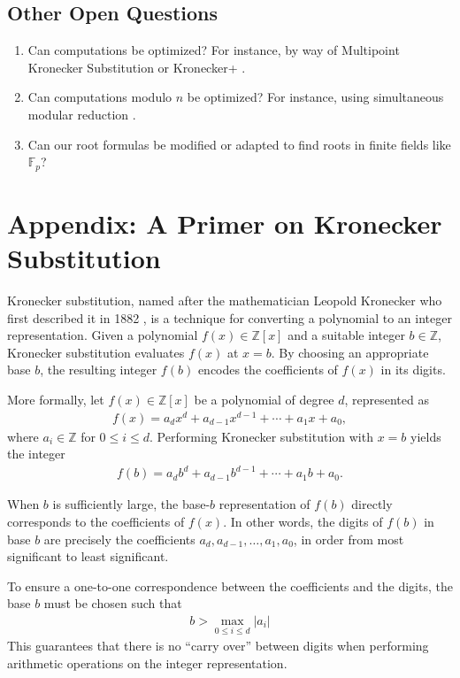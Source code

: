 \documentclass[11pt,reqno]{article}
\theoremstyle{plain}
\theoremstyle{definition}
\begin{document}
\subsection{Other Open Questions}
\begin{enumerate}
    \item Can computations be optimized? For instance, by way of Multipoint Kronecker Substitution \cite{harvey2009kronecker} or Kronecker+ \cite{bos2020postquantum}.
    \item Can computations modulo $n$ be optimized? For instance, using simultaneous modular reduction \cite{dumas2011simulataneous}.
    \item Can our root formulas be modified or adapted to find roots in finite fields like $\mathbb{F}_p$?
\end{enumerate}

\newpage
\section{Appendix: A Primer on Kronecker Substitution} \label{section:kronecker}
Kronecker substitution, named after the mathematician Leopold Kronecker who first described it in 1882 \cite{kronecker1882}, is a technique for converting a polynomial to an integer representation. Given a polynomial $f(x) \in \mathbb{Z}[x]$ and a suitable integer $b \in \mathbb{Z}$, Kronecker substitution evaluates $f(x)$ at $x = b$. By choosing an appropriate base $b$, the resulting integer $f(b)$ encodes the coefficients of $f(x)$ in its digits.

More formally, let $f(x) \in \mathbb{Z}[x]$ be a polynomial of degree $d$, represented as
\begin{align*}
f(x) = a_d x^d + a_{d-1} x^{d-1} + \cdots + a_1 x + a_0,
\end{align*}
where $a_i \in \mathbb{Z}$ for $0 \leq i \leq d$. Performing Kronecker substitution with $x = b$ yields the integer
\begin{align*}
f(b) = a_d b^d + a_{d-1} b^{d-1} + \cdots + a_1 b + a_0.
\end{align*}

When $b$ is sufficiently large, the base-$b$ representation of $f(b)$ directly corresponds to the coefficients of $f(x)$. In other words, the digits of $f(b)$ in base $b$ are precisely the coefficients $a_d, a_{d-1}, \ldots, a_1, a_0$, in order from most significant to least significant.

To ensure a one-to-one correspondence between the coefficients and the digits, the base $b$ must be chosen such that
\begin{align*}
    b > \max_{0 \leq i \leq d} |a_i|
\end{align*}
This guarantees that there is no ``carry over'' between digits when performing arithmetic operations on the integer representation.
\end{document}
